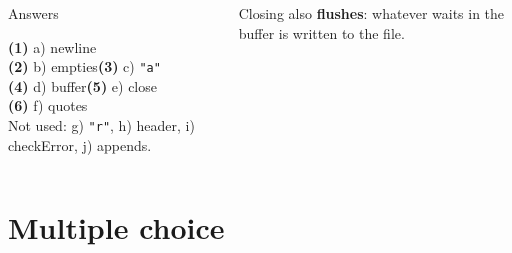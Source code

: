 \documentclass[aspectratio=169]{beamer}
\newcommand{\code}[1]{\texttt{#1}}
\begin{document}
\begin{frame}
\begin{columns}[T,onlytextwidth]
{\begin{contextbox}{Answers}
      \footnotesize\raggedright
      \textbf{(1)} a) newline\\[0.3em]
      \textbf{(2)} b) empties\quad \textbf{(3)} c) \code{"a"}\\[0.3em]
      \textbf{(4)} d) buffer\quad \textbf{(5)} e) close\\[0.3em]
      \textbf{(6)} f) quotes\\[0.3em]
      Not used: g) \code{"r"}, h) header, i) checkError, j) appends.
    \end{contextbox}
    \vspace{0.2em}
    {\small Closing also \textbf{flushes}: whatever waits in the buffer is written
    to the file.}}
  \end{columns}
\end{frame}

\section{Multiple choice}
\end{document}
